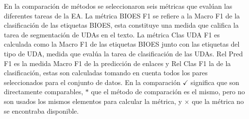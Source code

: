 \documentclass[a4paper,11pt,twocolumn,twoside]{article}
\begin{document}
En la comparación de métodos se seleccionaron seis métricas que evalúan las diferentes 
tareas de la EA. La métrica BIOES F1 se refiere 
a la Macro F1 de la clasificación de las etiquetas BIOES, esta constituye una medida
que califica la tarea de segmentación de UDAs en el texto. La métrica Clas UDA F1 es 
calculada como la Macro F1 de las etiquetas BIOES junto con las etiquetas del tipo de 
UDA, medida que evalúa la tarea de clasificación de las UDAs. Rel Pred F1 es la medida 
Macro F1 de la predicción de enlaces y Rel Clas F1 la de la clasificación, estas 
son calculadas tomando en cuenta todos los pares seleccionados para el conjunto de 
datos. En la comparación $\checkmark$ significa que son directamente comparables,
$*$ que el método de comparación es el mismo, pero no son usados los mismos 
elementos para calcular la métrica, y $\times$ que la métrica no se encontraba disponible.
\end{document}
